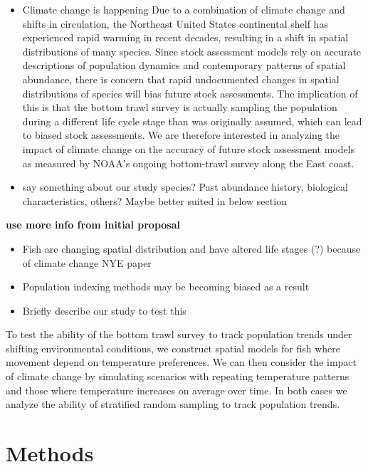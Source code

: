 \documentclass[
]{article}
\begin{document}
\begin{itemize}
\item
  Climate change is happening
  Due to a combination of climate change and shifts in circulation, the Northeast United States continental shelf has experienced rapid warming in recent decades, resulting in a shift in spatial distributions of many species. Since stock assessment models rely on accurate descriptions of population dynamics and contemporary patterns of spatial abundance, there is concern that rapid undocumented changes in spatial distributions of species will bias future stock assessments. The implication of this is that the bottom trawl survey is actually sampling the population during a different life cycle stage than was originally assumed, which can lead to biased stock assessments. We are therefore interested in analyzing the impact of climate change on the accuracy of future stock assessment models as measured by NOAA's ongoing bottom-trawl survey along the East coast.
\item
  say something about our study species? Past abundance history, biological characteristics, others? Maybe better suited in below section
\end{itemize}

\textbf{use more info from initial proposal}

\begin{itemize}
\item
  Fish are changing spatial distribution and have altered life stages (?) because of climate change
  NYE paper
\item
  Population indexing methods may be becoming biased as a result
\item
  Briefly describe our study to test this
\end{itemize}

To test the ability of the bottom trawl survey to track population trends under shifting environmental conditions, we construct spatial models for fish where movement depend on temperature preferences. We can then consider the impact of climate change by simulating scenarios with repeating temperature patterns and those where temperature increases on average over time. In both cases we analyze the ability of stratified random sampling to track population trends.

\section{Methods}
\end{document}
